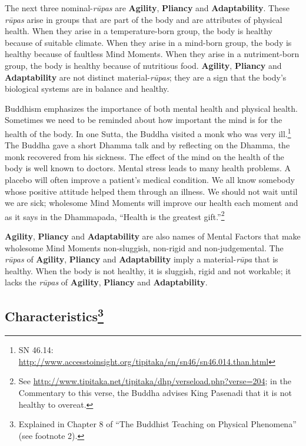 The next three nominal-\textit{rūpas} are \textbf{Agility}, \textbf{Pliancy} and \textbf{Adaptability}. These \textit{rūpas} arise in groups that are part of the body and are attributes of physical health. When they arise in a temperature-born group, the body is healthy because of suitable climate. When they arise in a mind-born group, the body is healthy because of faultless Mind Moments. When they arise in a nutriment-born group, the body is healthy because of nutritious food. \textbf{Agility}, \textbf{Pliancy} and \textbf{Adaptability} are not distinct material-\textit{rūpas}; they are a sign that the body’s biological systems are in balance and healthy.

Buddhism emphasizes the importance of both mental health and physical health. Sometimes we need to be reminded about how important the mind is for the health of the body. In one Sutta, the Buddha visited a monk who was very ill.\footnote{SN 46.14: \url{http://www.accesstoinsight.org/tipitaka/sn/sn46/sn46.014.than.html}} The Buddha gave a short Dhamma talk and by reflecting on the Dhamma, the monk recovered from his sickness. The effect of the mind on the health of the body is well known to doctors. Mental stress leads to many health problems. A placebo will often improve a patient’s medical condition. We all know somebody whose positive attitude helped them through an illness. We should not wait until we are sick; wholesome Mind Moments will improve our health each moment and as it says in the Dhammapada, “Health is the greatest gift.”\footnote{See \url{http://www.tipitaka.net/tipitaka/dhp/verseload.php?verse=204}; in the Commentary to this verse, the Buddha advises King Pasenadi that it is not healthy to overeat.}

\textbf{Agility}, \textbf{Pliancy} and \textbf{Adaptability} are also names of Mental Factors that make wholesome Mind Moments non-sluggish, non-rigid and non-judgemental. The \textit{rūpas} of \textbf{Agility}, \textbf{Pliancy} and \textbf{Adaptability} imply a material-\textit{rūpa} that is healthy. When the body is not healthy, it is sluggish, rigid and not workable; it lacks the \textit{rūpas} of \textbf{Agility}, \textbf{Pliancy} and \textbf{Adaptability}.

\subsection*{Characteristics\footnote{Explained in Chapter 8 of “The Buddhist Teaching on Physical Phenomena” (see footnote 2).}}

